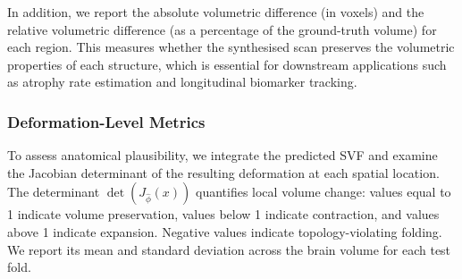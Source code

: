 In addition, we report the absolute volumetric difference (in voxels) and the relative volumetric difference (as a percentage of the ground-truth volume) for each region. This measures whether the synthesised scan preserves the volumetric properties of each structure, which is essential for downstream applications such as atrophy rate estimation and longitudinal biomarker tracking.

\subsubsection*{Deformation-Level Metrics}

To assess anatomical plausibility, we integrate the predicted SVF and examine the Jacobian determinant of the resulting deformation at each spatial location. The determinant $\det(J_{\hat{\phi}}(x))$ quantifies local volume change: values equal to 1 indicate volume preservation, values below 1 indicate contraction, and values above 1 indicate expansion. Negative values indicate topology-violating folding. We report its mean and standard deviation across the brain volume for each test fold.


